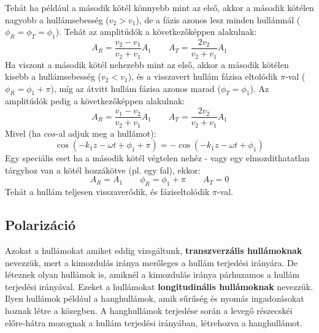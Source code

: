 \documentclass[a4paper,12pt]{article}
\begin{document}
Tehát ha például a második kötél könnyebb mint az első, akkor a második kötélen nagyobb a hullámsebesség ($v_2 > v_1$), de a fázis azonos lesz minden hullámnál ($\phi_R = \phi_T = \phi_1$).
Tehát az amplitúdók a következőképpen alakulnak:
\begin{equation}
    A_R = \frac{v_2 - v_1}{v_2 + v_1} A_1 \qquad A_T = \frac{2 v_2}{v_2 + v_1} A_1
\end{equation}
Ha viszont a második kötél nehezebb mint az első, akkor a második kötélen kisebb a hullámsebesség ($v_2 < v_1$), és a visszavert hullám fázisa eltolódik $\pi$-val ($\phi_R = \phi_1 + \pi$), míg az átvitt hullám fázisa
azonos marad ($\phi_T = \phi_1$). Az amplitúdók pedig a következőképpen alakulnak:
\begin{equation}
    A_R = \frac{v_1 - v_2}{v_2 + v_1} A_1 \qquad A_T = \frac{2 v_2}{v_2 + v_1} A_1
\end{equation}
Mivel (ha $cos$-al adjuk meg a hullámot):
\begin{equation}
    \cos(- k_1z - \omega t + \phi_1 + \pi) = - \cos(-k_1z - \omega t + \phi_1)
\end{equation}
Egy speciális eset ha a második kötél végtelen nehéz - vagy egy elmozdithatatlan tárgyhoz van a kötél hozzákötve (pl. egy fal), ekkor:
\begin{equation}
    A_R = A_1 \qquad \phi_R = \phi_1 + \pi \qquad A_T = 0
\end{equation}
Tehát a hullám teljesen visszaverődik, és fáziseltolódik $\pi$-val.

\subsection{Polarizáció}
Azokat a hullámokat amiket eddig vizsgáltunk, \textbf{transzverzális hullámoknak} nevezzük, mert a kimozdulás iránya merőleges a hullám terjedési irányára. De léteznek olyan hullámok is, amiknél a kimozdulás iránya párhuzamos a hullám terjedési irányával.
Ezeket a hullámokat \textbf{longitudinális hullámoknak} nevezzük. Ilyen hullámok például a hanghullámok, amik sűrűség és nyomás ingadozásokat hoznak létre a közegben. A hanghullámok terjedése során a levegő részecskéi előre-hátra mozognak
a hullám terjedési irányában, létrehozva a hanghullámot.
\end{document}
